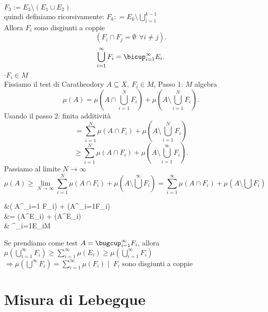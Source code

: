 \documentclass{article}
\begin{document}
\begin{dimo}
 $F_3 := E_3\setminus(E_1\cup E_2)$\\
 quindi definiamo ricorsivamente:
 $F_k : = E_k\setminus\bigcup_{i=1} ^{k-1}$\\
 Allora  $F_i$ sono disgiunti a coppie 
 \[
	 (F_i\cap F_j = \emptyset \ \ \forall i\neq j)
 .\] 
 \[
	 \bigcup_{i=1}^\infty F_i = \bicup_{i=1}^\infty E_i
 .\] 
 $\cdot F_i\in M$\\
 Fissiamo il test di Caratheodory $A\subseteq X, \ F_i\in M$, Passo 1: $M$ algebra\\
   \[
	  \mu(A) = \mu(A\cap\bigcup^N_{i=1}F_i) + \mu(A\setminus \bigcup_{i=1}^N F_i)
 .\] 
 Usando il passo 2: finita additività
 \[
	 = \sum^N_{i=1}\mu(A\cap F_i) + \mu (A\setminus\bigcup^N_{i=1}F_i)
 \] 
 \[
	 \geq \sum^N_{i=1} \mu(A\cap F_i) + \mu(A\setminus\bigcup^\infty_{i=1}F_i)
 .\] 
 Passiamo al limite $ N \rightarrow\infty$
\[\mu (A) \geq \lim_{N \rightarrow\infty} \sum^N_{i=1}\mu(A\cap F_i) + \mu(A\setminus \bigcup^\infty F_i) = \sum^\infty_{i=1} \mu(A\cap F_i) + \mu(A \setminus \bigcup F_i)\]
\begin{center}
\begin{aligend}
	
	&\dicentertyle\geq \mu ( A\cap \bigcup^\infty_{i=1} F_i) + \mu (A\setminus \bigcup^\infty_{i=1}F_i)\\
	&= \mu(A\cap \bigcup^\infty E_i) + \mu(A\setminus \bigcup^\infty E_i)\\
	& \Rightarrow \bigcup^\infty_{i=1}E_i\in M
\end{aligend}
\end{center}
Se prendiamo come test $A = \bugcup^\infty_{i=1}F_i$, allora $\mu(\bigcup^\infty_{i=1}F_i)\geq \sum^\infty_{i=1}\mu(E_i)\geq \mu(\bigcup^\infty_{i=1}F_i)$\\
$ \Rightarrow \mu(\bigcup^\infty F_i) = \sum^\infty_{i=1}\mu(F_i)$ |\
$F_i$ sono disgiunti a coppie
 \end{dimo}


\maketitle
	\newpage
	\section{Misura di Lebegque}
\end{document}

